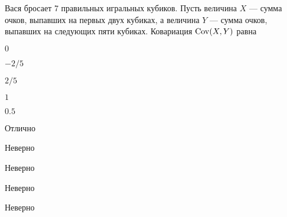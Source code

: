 
\begin{question}
Вася бросает 7 правильных игральных кубиков. Пусть величина \(X\) ---
сумма очков, выпавших на первых двух кубиках, а величина \(Y\) --- сумма
очков, выпавших на следующих пяти кубиках. Ковариация \(\operatorname{Cov}(X,Y)\)
равна
\begin{answerlist}
  \item \(0\)
  \item \(-2/5\)
  \item \(2/5\)
  \item \(1\)
  \item \(0.5\)
\end{answerlist}
\end{question}

\begin{solution}
\begin{answerlist}
  \item Отлично
  \item Неверно
  \item Неверно
  \item Неверно
  \item Неверно
\end{answerlist}
\end{solution}

